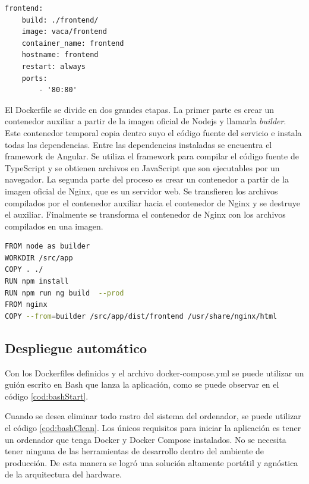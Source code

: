 \begin{lstlisting}[label=cod:dcFrontend,caption=Orquestación del servicio Frontend.]
frontend:
	build: ./frontend/
	image: vaca/frontend
	container_name: frontend
	hostname: frontend
	restart: always
	ports: 
		- '80:80'
\end{lstlisting}

El Dockerfile se divide en dos grandes etapas.
La primer parte es crear un contenedor auxiliar a partir de la imagen oficial de Nodejs y llamarla \emph{builder}.
Este contenedor temporal copia dentro suyo el código fuente del servicio e instala todas las dependencias.
Entre las dependencias instaladas se encuentra el framework de Angular.
Se utiliza el framework para compilar el código fuente de TypeScript y se obtienen archivos en JavaScript que son ejecutables por un navegador.
La segunda parte del proceso es crear un contenedor a partir de la imagen oficial de Nginx, que es un servidor web.
Se transfieren los archivos compilados por el contenedor auxiliar hacia el contenedor de Nginx y se destruye el auxiliar.
Finalmente se transforma el contenedor de Nginx con los archivos compilados en una imagen.

\begin{lstlisting}[language=bash,label=cod:dfFrontend,caption=Dockerfile del servicio Frontend.]
FROM node as builder
WORKDIR /src/app
COPY . ./
RUN npm install
RUN npm run ng build  --prod
FROM nginx
COPY --from=builder /src/app/dist/frontend /usr/share/nginx/html
\end{lstlisting}

\subsection{Despliegue automático}

Con los Dockerfiles definidos y el archivo docker-compose.yml se puede utilizar un guión escrito en Bash que lanza la aplicación, como se puede observar en el código \ref{cod:bashStart}.

Cuando se desea eliminar todo rastro del sistema del ordenador, se puede utilizar el código \ref{cod:bashClean}.
Los únicos requisitos para iniciar la aplicación es tener un ordenador que tenga Docker y Docker Compose instalados.
No se necesita tener ninguna de las herramientas de desarrollo dentro del ambiente de producción.
De esta manera se logró una solución altamente portátil y agnóstica de la arquitectura del hardware.

\newpage


